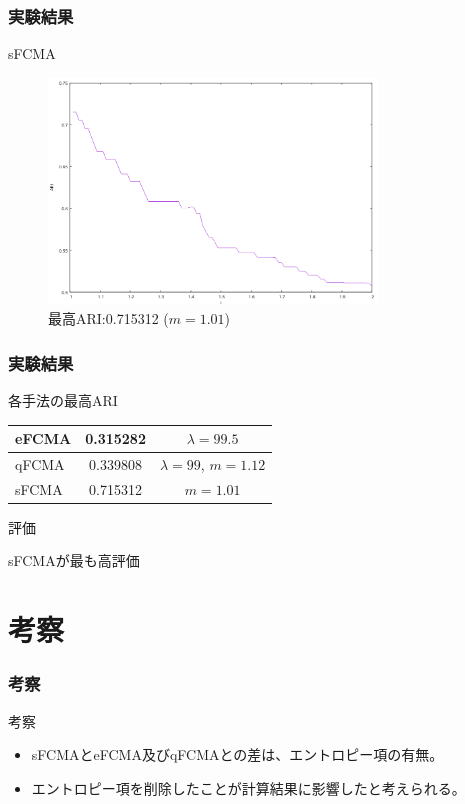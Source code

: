 \documentclass[13pt,dvipdfmx]{beamer}
\begin{document}
\begin{frame}\frametitle{実験結果}
  \begin{block}{sFCMA}
    \begin{figure}[htbp]
      \begin{center}
        \includegraphics[height=60mm]{sfcma_ARI.png}
      \end{center}
      \captionsetup{labelformat=empty,labelsep=none}
      \caption{最高ARI:0.715312 ($m=1.01$)}
    \end{figure}
  \end{block}
\end{frame}

\begin{frame}\frametitle{実験結果}
  \begin{block}{各手法の最高ARI}
    \vspace{5mm}
    \begin{table}
      \begin{tabular}{ l || c | c }\hline
        eFCMA & 0.315282 & $\lambda = 99.5$\\ \hline  
        qFCMA & 0.339808 & $\lambda = 99 $\;, \;$m = 1.12$\\  \hline
        sFCMA & 0.715312 & $m = 1.01$\\ \hline
      \end{tabular}
    \end{table}
  \end{block}
  \begin{block}{評価}
    \begin{center}
      sFCMAが最も高評価
    \end{center}
  \end{block}
\end{frame}

\section{考察}
\begin{frame}\frametitle{考察}
  \begin{block}{考察}
    \begin{itemize}
    \item sFCMAとeFCMA及びqFCMAとの差は、エントロピー項の有無。
    \item エントロピー項を削除したことが計算結果に影響したと考えられる。
    \end{itemize}
  \end{block}
\end{frame}
\end{document}
